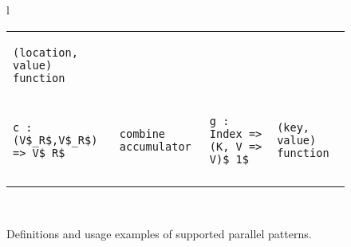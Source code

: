\begin{figure*}
\begin{tabular}{l}
{\begin{tabular*}{0.95\textwidth}{llll}
{\begin{lstlisting}[numbers=none,mathescape=true]
(location, value) function
\end{lstlisting}} \\

{\begin{lstlisting}[numbers=none,mathescape=true]
c : (V$_R$,V$_R$) => V$_R$
\end{lstlisting}} &

{\begin{lstlisting}[numbers=none,mathescape=true]
combine accumulator
\end{lstlisting}} \hspace{51pt} &

{\begin{lstlisting}[numbers=none,mathescape=true]
g : Index => (K, V => V)$_1$
\end{lstlisting}} &

{\begin{lstlisting}[numbers=none,mathescape=true]
(key, value) function
\end{lstlisting}} \\
\noalign{\hrule height 1.5pt}

\end{tabular*}}
\\
\end{tabular}
\caption{\label{fig:ppl-syntax}Definitions and usage examples of supported parallel patterns.}
\end{figure*}